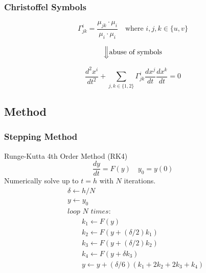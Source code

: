 \documentclass{beamer}
\begin{document}

\begin{frame}

	\frametitle{Christoffel Symbols}
	
	\begin{equation*} 
	\Gamma^i_{jk} = \frac{\mu_{jk}\cdot\mu_i}{\mu_i\cdot\mu_i} \quad\text{where } i,j,k \in \{u,v\}
	\end{equation*}
	
	$$\Big\Downarrow \text{abuse of symbols}$$
	
	\begin{equation*}
	\frac{d^2x^i}{dt^2} + \sum_{j,k \in \{1,2\}} \Gamma^i_{jk}\frac{dx^j}{dt}\frac{dx^k}{dt} = 0
	\end{equation*}

\end{frame}

\begin{frame}

\section{Method}

\frametitle{Stepping Method}

	Runge-Kutta 4th Order Method (RK4)
	\begin{equation*}
	\frac{dy}{dt} = F(y) \quad y_0 = y(0)
	\end{equation*}
	Numerically solve up to $t=h$ with $N$ iterations.
	\begin{align*}
	& \delta \gets h/N \\
	& y \gets y_0 \\
	& \textit{loop } N \textit{ times:} \\
	& \quad\quad k_1 \gets F(y) \\
	& \quad\quad k_2 \gets F\left(y+(\delta/2)k_1\right) \\
	& \quad\quad k_3 \gets F\left(y+(\delta/2)k_2\right) \\
	& \quad\quad k_4 \gets F\left(y + \delta k_3\right) \\
	& \quad\quad y \gets y+(\delta/6)(k_1+2k_2+2k_3+k_4)
	\end{align*}

\end{frame}

\end{document}
